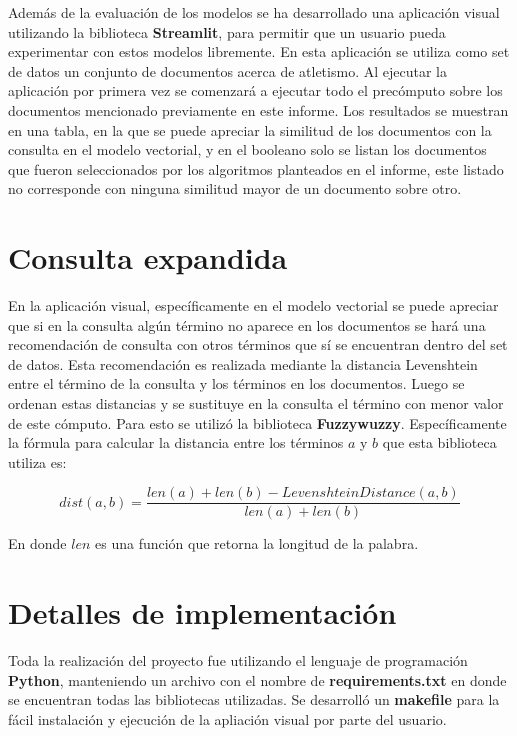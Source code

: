 \documentclass{llncs}
\begin{document}
Además de la evaluación de los modelos se ha desarrollado una aplicación visual utilizando la biblioteca {\bfseries Streamlit}, para permitir que un usuario pueda experimentar con estos modelos libremente. En esta aplicación se utiliza como set de datos un conjunto de documentos acerca de atletismo. Al ejecutar la aplicación por primera vez se comenzará a ejecutar todo el precómputo sobre los documentos mencionado previamente en este informe. Los resultados se muestran en una tabla, en la que se puede apreciar la similitud de los documentos con la consulta en el modelo vectorial, y en el booleano solo se listan los documentos que fueron seleccionados por los algoritmos planteados en el informe, este listado no corresponde con ninguna similitud mayor de un documento sobre otro.

\section{Consulta expandida}

En la aplicación visual, específicamente en el modelo vectorial se puede apreciar que si en la consulta algún término no aparece en los documentos se hará una recomendación de consulta con otros términos que sí se encuentran dentro del set de datos. Esta recomendación es realizada mediante la distancia Levenshtein entre el término de la consulta y los términos en los documentos. Luego se ordenan estas distancias y se sustituye en la consulta el término con menor valor de este cómputo. Para esto se utilizó la biblioteca {\bfseries Fuzzywuzzy}. Específicamente la fórmula para calcular la distancia entre los términos $a$ y $b$ que esta biblioteca utiliza es:

\begin{equation}
    dist(a, b) = \frac{len(a) + len(b) - LevenshteinDistance(a, b)}{len(a) + len(b)}
\end{equation}

En donde $len$ es una función que retorna la longitud de la palabra.

\section{Detalles de implementación}

Toda la realización del proyecto fue utilizando el lenguaje de programación {\bfseries Python}, manteniendo un archivo con el nombre de {\bfseries requirements.txt} en donde se encuentran todas las bibliotecas utilizadas. Se desarrolló un {\bfseries makefile} para la fácil instalación y ejecución de la apliación visual por parte del usuario.
\end{document}
